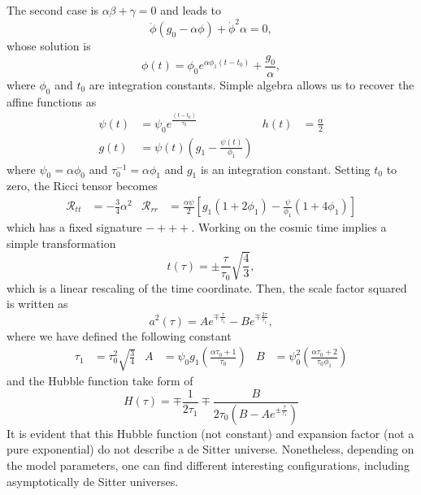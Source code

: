 \documentclass[epj]{svjour}
\begin{document}
The second case is $\alpha\beta + \gamma = 0$ and leads to
\begin{dmath}
\label{diff_eq_phi_alpha_beta_gamma_0}
    \ddot{\phi}\left(g_0 - \alpha\phi\right) + \dot{\phi}^2 \alpha  = 0,
\end{dmath}
whose solution is
\begin{equation}   
\phi(t) = \phi_0 e^{\alpha\phi_1\left(t -t_0\right)} + \frac{g_0}{\alpha},
\end{equation}
where $\phi_0$ and $t_0$ are integration constants. Simple algebra allows us to recover the affine functions as 
\begin{align}
\label{special_second_solution}
\psi(t) & = \psi_0 e^{\frac{\left(t -t_0\right)}{\tau_0}} & h(t) & = \frac{\alpha }{2} \\
g(t) & =\psi(t)\left(g_1 - \frac{\psi(t)}{\phi_1}\right)  \nonumber
\end{align}
where $\psi_0 = \alpha\phi_0$ and $\tau_0^{-1} = \alpha\phi_1$ and $g_1$ is an integration constant. Setting $t_0$ to zero, the Ricci tensor becomes
\begin{align}
\mathcal{R}_{tt} & = -\frac{3}{4}\alpha^2 & \mathcal{R}_{rr} & = \frac{\alpha\psi}{2} \left[g_1(1+2\phi_1)-\frac{\psi}{\phi_1}\left(1+4\phi_1\right)\right] 
\end{align}
which has a fixed signature $-+++$. Working on the cosmic time implies a simple transformation
\begin{equation}
t(\tau) =\pm \frac{\tau}{\tau_0}\sqrt{\frac{4}{3}},
\end{equation}
which is a linear rescaling of the time coordinate. Then, the scale factor squared is written as
\begin{equation}
a^2(\tau) = Ae^{\mp\frac{\tau}{\tau_1}} - Be^{\mp\frac{2\tau}{\tau_1}},
\end{equation}
where we have defined the following constant
\begin{align}
\label{definitions}
\tau_1 & = \tau_0^2 \sqrt{\frac{3}{4}} & A & = \psi_0g_1\left(\frac{\alpha\tau_0 + 1}{\tau_0}\right) & B & = \psi_0^2\left(\frac{\alpha\tau_0 + 2}{\tau_0\phi_1}\right)
\end{align}
and the Hubble function take form of
\begin{equation}
H(\tau) = \mp \frac{1}{2\tau_1} \mp \frac{B}{2\tau_0\left(B - Ae^{\pm \frac{\tau}{\tau_1}}\right)}
\end{equation}
It is evident that this Hubble function (not constant) and expansion factor (not a pure exponential) do not describe a de Sitter universe. Nonetheless, depending on the model parameters, one can find different interesting configurations, including asymptotically de Sitter universes. %
\end{document}
